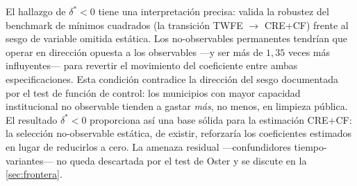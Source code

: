 El hallazgo de $\delta^* < 0$ tiene una interpretación precisa: valida la robustez del benchmark de mínimos cuadrados (la transición TWFE $\to$ CRE+CF) frente al sesgo de variable omitida estática.
Los no-observables permanentes tendrían que operar en dirección opuesta a los observables ---y ser más de $1{,}35$ veces más influyentes--- para revertir el movimiento del coeficiente entre ambas especificaciones.
Esta condición contradice la dirección del sesgo documentada por el test de función de control: los municipios con mayor capacidad institucional no observable tienden a gastar \textit{más}, no menos, en limpieza pública.
El resultado $\delta^* < 0$ proporciona así una base sólida para la estimación CRE+CF: la selección no-observable estática, de existir, reforzaría los coeficientes estimados en lugar de reducirlos a cero.
La amenaza residual ---confundidores tiempo-variantes--- no queda descartada por el test de Oster y se discute en la \cref{sec:frontera}.
